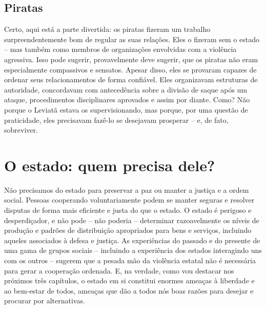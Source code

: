 \subsection*{Piratas}

Certo, aqui está a parte divertida: os piratas fizeram um trabalho surpreendentemente bom de regular as suas relações. Eles o fizeram sem o estado -- mas também como membros de organizações envolvidas com a violência agressiva. Isso pode sugerir, provavelmente deve sugerir, que os piratas não eram especialmente compassivos e sensatos. Apesar disso, eles se provaram capazes de ordenar seus relacionamentos de forma confiável. Eles organizavam estruturas de autoridade, concordavam com antecedência sobre a divisão de saque após um ataque, procedimentos disciplinares aprovados e assim por diante. Como? Não porque o Leviatã estava os supervisionando, mas porque, por uma questão de praticidade, eles precisavam fazê-lo se desejavam prosperar -- e, de fato, sobreviver.

\section{O estado: quem precisa dele?}

Não precisamos do estado para preservar a paz ou manter a justiça e a ordem social. Pessoas cooperando voluntariamente podem se manter seguras e resolver disputas de forma mais eficiente e justa do que o estado. O estado é perigoso e desperdiçador, e não pode -- não poderia -- determinar razoavelmente os níveis de produção e padrões de distribuição apropriados para bens e serviços, incluindo aqueles associados à defesa e justiça. As experiências do passado e do presente de uma gama de grupos sociais -- incluindo a experiência dos estados interagindo uns com os outros -- sugerem que a pesada mão da violência estatal não é necessária para gerar a cooperação ordenada. E, na verdade, como vou destacar nos próximos três capítulos, o estado em si constitui enormes ameaças à liberdade e ao bem-estar de todos, ameaças que dão a todos nós boas razões para desejar e procurar por alternativas.